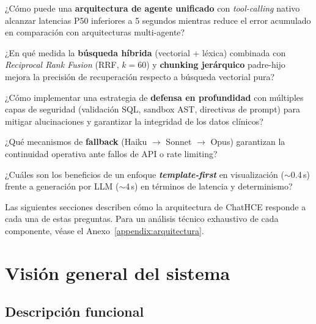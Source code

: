\begin{description}[nosep, leftmargin=1em, labelindent=0em]
  \item[\textbf{RQ1}:] ¿Cómo puede una \textbf{arquitectura de agente unificado} con \textit{tool-calling} nativo alcanzar latencias P50 inferiores a 5 segundos mientras reduce el error acumulado en comparación con arquitecturas multi-agente?
  
  \item[\textbf{RQ2}:] ¿En qué medida la \textbf{búsqueda híbrida} (vectorial + léxica) combinada con \textit{Reciprocal Rank Fusion} (\ac{RRF}, $k=60$) y \textbf{chunking jerárquico} padre-hijo mejora la precisión de recuperación respecto a búsqueda vectorial pura?
  
  \item[\textbf{RQ3}:] ¿Cómo implementar una estrategia de \textbf{defensa en profundidad} con múltiples capas de seguridad (validación \ac{SQL}, sandbox \ac{AST}, directivas de prompt) para mitigar alucinaciones y garantizar la integridad de los datos clínicos?
  
  \item[\textbf{RQ4}:] ¿Qué mecanismos de \textbf{fallback} (Haiku $\rightarrow$ Sonnet $\rightarrow$ Opus) garantizan la continuidad operativa ante fallos de \ac{API} o rate limiting?
  
  \item[\textbf{RQ5}:] ¿Cuáles son los beneficios de un enfoque \textbf{\textit{template-first}} en visualización ($\sim$0.4\,s) frente a generación por \ac{LLM} ($\sim$4\,s) en términos de latencia y determinismo?
\end{description}

Las siguientes secciones describen cómo la arquitectura de ChatHCE responde a cada una de estas preguntas. Para un análisis técnico exhaustivo de cada componente, véase el Anexo~\ref{appendix:arquitectura}.

\section{Visión general del sistema}
\label{sec:vision}

\subsection{Descripción funcional}

